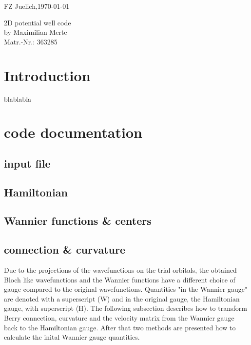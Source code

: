 \documentclass{scrreprt}
\begin{document}
\begin{flushright}
FZ Juelich,\today \\
\bigskip
\end{flushright}
\begin{flushleft}
 {\huge 2D potential well code}\\
 \bigskip
 \bigskip
 by Maximilian Merte \\
 Matr.-Nr.: 363285 \\
\bigskip
\bigskip
\end{flushleft}


\tableofcontents

\chapter{Introduction}


blablabla


\chapter{code documentation}

\section{input file}

\section{Hamiltonian}

\section{Wannier functions \& centers}



\section{connection \& curvature}
Due to the projections of the wavefunctions on the trial orbitals, the obtained Bloch like wavefunctions and the Wannier functions have a 
different choice of gauge compared to the original wavefunctions. Quantities "in the Wannier gauge" are denoted with a superscript (W) and in the original gauge, the Hamiltonian gauge, with superscript (H). The following subsection describes how to transform Berry connection, curvature and the velocity matrix from the Wannier gauge back to the Hamiltonian gauge. After that two methods are presented how to calculate the inital Wannier gauge quantities.
\end{document}
